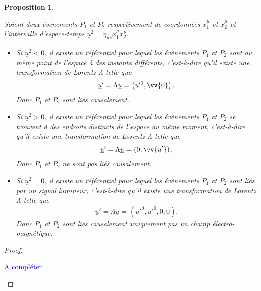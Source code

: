 \documentclass[a4paper,11pt]{report}
\theoremstyle{definition}
\theoremstyle{plain}
\newtheorem{prop}[thm]{Proposition}
\theoremstyle{definition}
\theoremstyle{remark}
\newcommand{\comp}{\begin{center}\textcolor{blue}{A compléter}\end{center}}
\begin{document}
            \begin{prop}\begin{leftbar}
                Soient deux évènements $P_1$ et $P_2$ respectivement de coordonnées $x_1^\mu$ et $x_2^\mu$ et l'intervalle d'espace-temps $\underline{u}^2 = \eta_{\mu\nu}x_1^\mu x_2^\nu$.
                \begin{itemize}[label = \textbullet]
                    \item Si $\underline{u}^2<0$, il existe un référentiel pour lequel les évènements $P_1$ et $P_2$ sont au même point de l'espace à des instants différents, c'est-à-dire qu'il existe une transformation de Lorentz $\Lambda$ telle que
                    \begin{equation}
                        \underline{u}' = \Lambda \underline{u} = \left(u'^0,\vv{0}\right).
                    \end{equation}
                    Donc $P_1$ et $P_2$ sont liés causalement.
                    \item Si $\underline{u}^2>0$, il existe un référentiel pour lequel les évènements $P_1$ et $P_2$ se trouvent à des endroits distincts de l'espace au même moment, c'est-à-dire qu'il existe une transformation de Lorentz $\Lambda$ telle que
                    \begin{equation}
                        \underline{u}' = \Lambda \underline{u} = \left(0,\vv{u'}\right).
                    \end{equation}
                    Donc $P_1$ et $P_2$ ne sont pas liés causalement.
                    \item Si $\underline{u}^2=0$, il existe un référentiel pour lequel les évènements $P_1$ et $P_2$ sont liés par un signal lumineux, c'est-à-dire qu'il existe une transformation de Lorentz $\Lambda$ telle que
                    \begin{equation}
                        \underline{u}' = \Lambda \underline{u} = \left(u'^0,u'^0,0,0\right).
                    \end{equation}
                    Donc $P_1$ et $P_2$ sont liés causalement uniquement pas un champ électro-magnétique.
                \end{itemize}
            \end{leftbar}\end{prop}
            
            \begin{proof}${}$\\
                \comp
            \end{proof}
        
\end{document}
